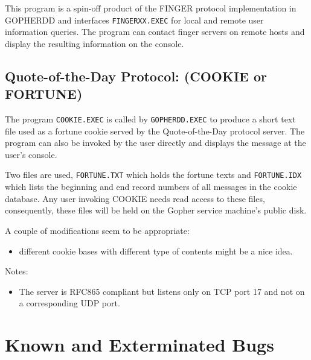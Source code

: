   This program is a spin-off product of the FINGER protocol
  implementation in GOPHERDD and interfaces {\tt FINGERXX.EXEC} for local and
  remote user information queries.  The program can contact finger
  servers on remote hosts and display the resulting information on the
  console.
 
 


\subsection{Quote-of-the-Day Protocol: (COOKIE or FORTUNE)}
 
  The program {\tt COOKIE.EXEC} is called by {\tt GOPHERDD.EXEC}
  to produce a short text file used as a fortune cookie served by the
  Quote-of-the-Day protocol \cite{rfc865} server.
  The program can also be invoked by the user directly and displays the
  message at the user's console.
 
  Two files are used, {\tt FORTUNE.TXT} which holds the fortune texts and
  {\tt FORTUNE.IDX} which lists the beginning and end record numbers of
  all messages in the cookie database.  Any user invoking COOKIE needs
  read access to these files, consequently, these files will be held
  on the Gopher service machine's public disk.
 
\noindent A couple of modifications seem to be appropriate:
\begin{itemize}
\item different cookie bases with different type of contents might be a
     nice idea.
\end{itemize}

\noindent Notes:
\begin{itemize}
\item  The server is RFC865 compliant but listens only on TCP port 17
     and not on a corresponding UDP port.
\end{itemize}
 
 



\section{Known and Exterminated Bugs}\label{bugs}



